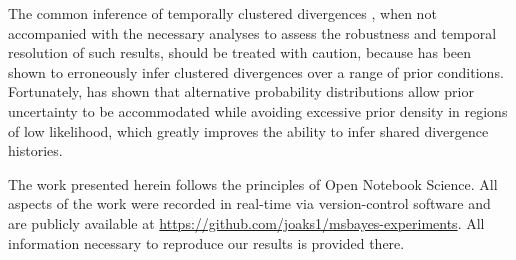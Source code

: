 The common inference of temporally clustered divergences \citep{Barber2010,
    Bell2012, Carnaval2009, Chan2011, Daza2010, Hickerson2006, Huang2011,
    Lawson2010, Leache2007, Plouviez2009, Stone2012, Voje2009}, when not
accompanied with the necessary analyses to assess the robustness and temporal
resolution of such results, should be treated with caution, because \msb has
been shown to erroneously infer clustered divergences over a range of prior
conditions.
Fortunately, \citet{Oaks2014dpp} has shown that alternative probability
distributions allow prior uncertainty to be accommodated while avoiding
excessive prior density in regions of low likelihood, which greatly improves
the ability to infer shared divergence histories.


The work presented herein follows the principles of Open Notebook Science.
All aspects of the work were recorded in real-time via version-control software
and are publicly available at
\href{https://github.com/joaks1/msbayes-experiments}{\url{https://github.com/joaks1/msbayes-experiments}}.
All information necessary to reproduce our results is provided there.

